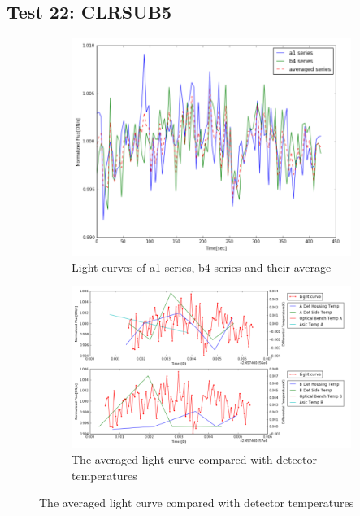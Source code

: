 \documentclass{aastex6}
\begin{document}
\subsection{Test 22: CLRSUB5} 
\begin{figure}[H]
    \centering
    \begin{subfigure}{1}
        \includegraphics[scale=0.4]{ts_test22}
        \caption{Light curves of a1 series, b4 series and their average}
    \end{subfigure}

    \begin{subfigure}{2}
        \includegraphics[scale=0.4]{temp_test22}
        \caption{The averaged light curve compared with detector temperatures}
    \end{subfigure}
   

\end{figure}
\end{document}
